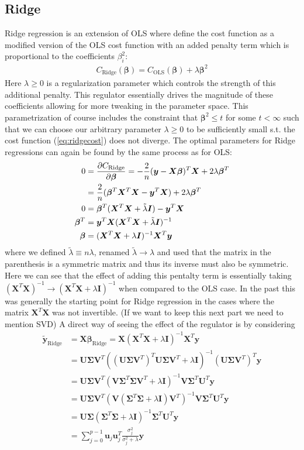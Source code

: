 \documentclass[%
reprint,
amsmath,amssymb,
aps,
]{revtex4-2}
\newcommand{\f}[2]{\frac{#1}{#2}}
\begin{document}
\subsection{Ridge}
Ridge regression is an extension of OLS where define the cost function as a modified version of the OLS cost function with an added penalty term which is proportional to the coefficients $\beta_i^2$:
\begin{align}
	C_\text{Ridge}(\bm\beta)=C_\text{OLS}(\bm\beta)+\lambda\bm\beta^2
	\label{eq:ridgecost}
\end{align}
Here $\lambda\geq0$ is a regularization parameter which controls the strength of this additional penalty. This regulator essentially drives the magnitude of these coefficients allowing for more tweaking in the parameter space. This parametrization of course includes the constraint that $\bm{\beta}^2\leq t$ for some $t<\infty$ such that we can choose our arbitrary parameter $\lambda\geq0$ to be sufficiently small s.t. the cost function (\ref{eq:ridgecost}) does not diverge. The optimal parameters for Ridge regressions can again be found by the same process as for OLS:
\begin{align*}
	0&=\pdv{C_\text{Ridge}}{\bm{\beta}}=-\f2n(\bm{y}-\bm{X}\bm{\beta})^T\bm{X}+2\lambda\bm{\beta}^T\\
	&=\f2n(\bm{\beta}^T\bm{X}^T\bm{X}-\bm{y}^T\bm{X})+2\lambda\bm{\beta}^T\\
	0&=\bm{\beta}^T(\bm{X}^T\bm{X}+\tilde{\lambda}\bm{I})-\bm{y}^T\bm{X}\\
	\bm{\beta}^T&=\bm{y}^T\bm{X}(\bm{X}^T\bm{X}+\tilde{\lambda}\bm{I})^{-1}\\
	\bm{\beta}&=(\bm{X}^T\bm{X}+\lambda\bm{I})^{-1}\bm{X}^T\bm{y}
\end{align*}
where we defined $\tilde{\lambda}\equiv n\lambda$, renamed $\tilde{\lambda}\to\lambda$ and used that the matrix in the parenthesis is a symmetric matrix and thus its inverse must also be symmetric. Here we can see that the effect of adding this pentalty term is essentially taking $(\bm X^T\bm X)^{-1}\to(\bm X^T\bm X+\lambda\bm I)^{-1}$ when compared to the OLS case. In the past this was generally the starting point for Ridge regression in the cases where the matrix $\bm X^T\bm X$ was not invertible. \color{red}(If we want to keep this next part we need to mention SVD) \color{black}A direct way of seeing the effect of the regulator is by considering
\begin{align*}
	\tilde{\bm{y}}_\text{Ridge}&=\bm{X\beta}_\text{Ridge}=\bm{X}(\bm{X}^T\bm{X}+\lambda\bm I)^{-1}\bm{X}^T\bm{y}\\
	&=\bm{U\Sigma V}^T((\bm{U\Sigma V}^T)^T\bm{U\Sigma V}^T+\lambda\bm I)^{-1}(\bm{U\Sigma V}^T)^T\bm{y}\\
	&=\bm{U\Sigma V}^T(\bm{V}\bm{\Sigma}^T\bm{\Sigma}\bm{V}^T+\lambda\bm I)^{-1}\bm{V}\bm{\Sigma}^T\bm{U}^T\bm{y}\\
	&=\bm{U\Sigma V}^T(\bm{V}({\bm\Sigma}^T\bm{\Sigma}+\lambda\bm I)\bm{V}^T)^{-1}\bm{V}\bm{\Sigma}^T\bm{U}^T\bm{y}\\
	&=\bm{U\Sigma }({\bm\Sigma}^T\bm{\Sigma}+\lambda\bm I)^{-1}\bm{\Sigma}^T\bm{U}^T\bm{y}\\
	&=\sum_{j=0}^{p-1}\bm{u}_j\bm{u}_j^T\frac{\sigma_j^2}{\sigma_j^2+\lambda}\bm{y}
\end{align*}
\end{document}
